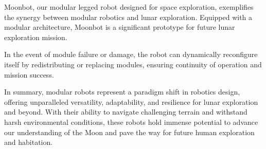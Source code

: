 
Moonbot, our modular legged robot designed for space exploration, exemplifies the synergy between modular robotics and lunar exploration. Equipped with a modular architecture, Moonbot is a significant prototype for future lunar exploration mission.

In the event of module failure or damage, the robot can dynamically reconfigure itself by redistributing or replacing modules, ensuring continuity of operation and mission success.

In summary, modular robots represent a paradigm shift in robotics design, offering unparalleled versatility, adaptability, and resilience for lunar exploration and beyond. With their ability to navigate challenging terrain and withstand harsh environmental conditions, these robots hold immense potential to advance our understanding of the Moon and pave the way for future human exploration and habitation.

